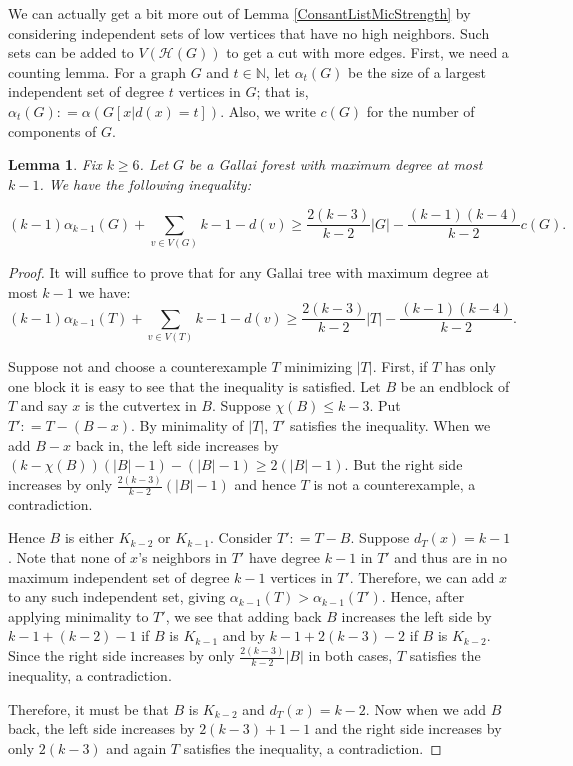 \documentclass[12pt]{article}
\theoremstyle{plain}
\newtheorem{lem}[thm]{Lemma}
\theoremstyle{definition}
\theoremstyle{remark}
\newcommand{\fancy}[1]{\mathcal{#1}}
\newcommand{\IN}{\mathbb{N}}
\newcommand{\HH}{\fancy{H}}
\newcommand{\card}[1]{\left|#1\right|}
\newcommand{\DefinedAs}{\mathrel{\mathop:}=}
\begin{document}
We can actually get a bit more out of Lemma \ref{ConsantListMicStrength} by considering independent sets of low vertices that have no high neighbors.  Such sets can be added to $V(\HH(G))$ to get a cut with more edges.  First, we need a counting lemma.  For a graph $G$ and $t \in \IN$, let $\alpha_t(G)$ be the size of a largest independent set of degree $t$ vertices in $G$; that is, $\alpha_t(G) \DefinedAs \alpha(G[x|d(x) = t])$.  Also, we write $c(G)$ for the number of components of $G$.

\begin{lem}\label{GallaiTreeCount}
Fix $k \geq 6$. Let $G$ be a Gallai forest with maximum degree at most $k-1$.  We have the following inequality:

\[(k-1)\alpha_{k-1}(G) + \sum_{v \in V(G)} k-1 - d(v) \geq \frac{2(k-3)}{k-2}\card{G} - \frac{(k-1)(k-4)}{k-2}c(G).\]
\end{lem}
\begin{proof}
It will suffice to prove that for any Gallai tree with maximum degree at most $k-1$ we have:
\[(k-1)\alpha_{k-1}(T) + \sum_{v \in V(T)} k-1 - d(v) \geq \frac{2(k-3)}{k-2}\card{T} - \frac{(k-1)(k-4)}{k-2}.\]

Suppose not and choose a counterexample $T$ minimizing $\card{T}$.  First, if $T$ has only one block it is easy to see that the inequality is satisfied.  Let $B$ be an endblock of $T$ and say $x$ is the cutvertex in $B$.  Suppose $\chi(B) \leq k-3$.  Put $T' \DefinedAs T - (B-x)$.  By minimality of $\card{T}$, $T'$ satisfies the inequality.  When we add $B-x$ back in, the left side increases by $(k-\chi(B))(\card{B}-1) - (\card{B} - 1) \geq 2(\card{B} - 1)$.  But the right side increases by only $\frac{2(k-3)}{k-2}(\card{B} - 1)$ and hence $T$ is not a counterexample, a contradiction.

Hence $B$ is either $K_{k-2}$ or $K_{k-1}$.  Consider $T' \DefinedAs T - B$.  Suppose $d_T(x) = k-1$. Note that none of $x$'s neighbors in $T'$ have degree $k-1$ in $T'$ and thus are in no maximum independent set of degree $k-1$ vertices in $T'$.  Therefore, we can add $x$ to any such independent set, giving $\alpha_{k-1}(T) > \alpha_{k-1}(T')$.  Hence, after applying minimality to $T'$, we see that adding back $B$ increases the left side by $k-1 + (k-2) - 1$ if $B$ is $K_{k-1}$ and by $k-1 + 2(k-3) - 2$ if $B$ is $K_{k-2}$.  Since the right side increases by only $\frac{2(k-3)}{k-2}\card{B}$ in both cases, $T$ satisfies the inequality, a contradiction.

Therefore, it must be that $B$ is $K_{k-2}$ and $d_T(x) = k-2$.  Now when we add $B$ back, the left side increases by $2(k-3) + 1 - 1$ and the right side increases by only $2(k-3)$ and again $T$ satisfies the inequality, a contradiction.
\end{proof}
\end{document}
